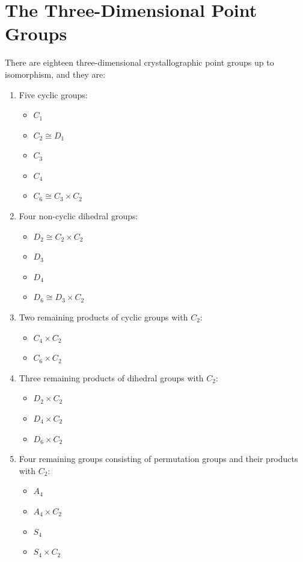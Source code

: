 \section{The Three-Dimensional Point Groups}
\begin{importanttheorem}{}{}
	There are eighteen three-dimensional crystallographic point groups up to isomorphism, and they are:
	\begin{enumerate}
		\item Five cyclic groups:
		\begin{itemize}
			\item $C_1$
			\item $C_2 \cong D_1$
			\item $C_3$
			\item $C_4$
			\item $C_6 \cong C_3 \times C_2$
		\end{itemize}
		\item Four non-cyclic dihedral groups:
		\begin{itemize}
			\item $D_2 \cong C_2 \times C_2$
			\item $D_3$
			\item $D_4$ 
			\item $D_6 \cong D_3 \times C_2$
		\end{itemize}
		\item Two remaining products of cyclic groups with $C_2$: 
		\begin{itemize}
			\item $C_4 \times C_2$
			\item $C_6 \times C_2$
		\end{itemize}
		\item Three remaining products of dihedral groups with $C_2$: 
		\begin{itemize}
			\item $D_2 \times C_2$
			\item $D_4 \times C_2$ 
			\item $D_6 \times C_2$
		\end{itemize}
		\item Four remaining groups consisting of permutation groups and their products with $C_2$:
		\begin{itemize}
			\item $A_4$
			\item $A_4 \times C_2$
			\item $S_4$
			\item $S_4 \times C_2$
		\end{itemize}
	\end{enumerate}
\end{importanttheorem}
